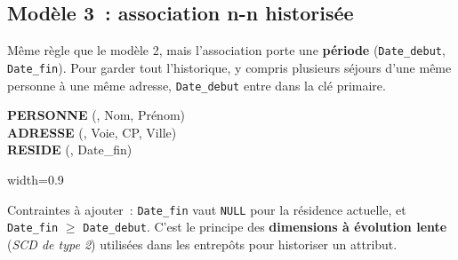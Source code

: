 \newpage
\subsection*{Modèle 3~: association n-n historisée}
{}

\noindent Même règle que le modèle 2, mais l'association porte une \textbf{période} (\texttt{Date\_debut}, \texttt{Date\_fin}). Pour garder tout l'historique, y compris plusieurs séjours d'une même personne à une même adresse, \texttt{Date\_debut} entre dans la clé primaire.

\begin{tcolorbox}[colback=white, colframe=title1, title=MLD -- Modèle 3]
\textbf{PERSONNE} (, Nom, Prénom) \\
\textbf{ADRESSE} (, Voie, CP, Ville) \\
\textbf{RESIDE} (, Date\_fin)
\end{tcolorbox}

\vspace{0.5cm}
\begin{center}
\begin{adjustbox}{width=0.9\linewidth}
\end{adjustbox}
\legende
\end{center}

\vspace{0.5cm}
\noindent Contraintes à ajouter~: \texttt{Date\_fin} vaut \texttt{NULL} pour la résidence actuelle, et \texttt{Date\_fin} $\geq$ \texttt{Date\_debut}. C'est le principe des \textbf{dimensions à évolution lente} (\textit{SCD de type 2}) utilisées dans les entrepôts pour historiser un attribut.


